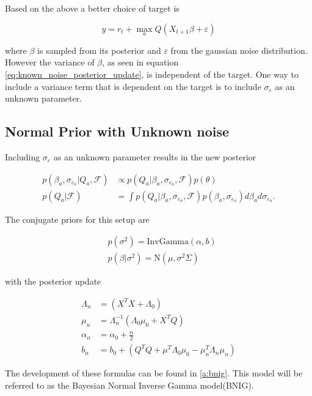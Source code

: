 Based on the above a better choice of target is

$$
y = r_t + \max_aQ(X_{t+1}\beta + \varepsilon)
$$

where $\beta$ is sampled from its posterior and $\varepsilon$ from the gaussian noise distribution. However the variance of $\beta$, as seen in equation \ref{eq:known_noise_posterior_update}, is independent of the target. One way to include a variance term that is dependent on the target is to include $\sigma_{\varepsilon}$ as an unknown parameter.

\subsection{Normal Prior with Unknown noise}

Including $\sigma_{\varepsilon}$ as an unknown parameter results in the new posterior 

\begin{align*}
    p(\beta_a, \sigma_{\varepsilon_a}|Q_a, \mathcal{F}) &\propto p(Q_a| \beta_a, \sigma_{\varepsilon_a}, \mathcal{F})p(\theta) \\
    p(Q_a|\mathcal{F}) &= \int p(Q_a|\beta_a, \sigma_{\varepsilon_a}, \mathcal{F}) p(\beta_a, \sigma_{\varepsilon_a})d\beta_a d\sigma_{\varepsilon_a}.
\end{align*}

The conjugate priors for this setup are

\begin{align*}
    & p(\sigma^2) = \text{InvGamma}(\alpha, b)          \\
    & p(\beta|\sigma^2) = \text{N}(\mu, \sigma^2\Sigma) 
\end{align*}

with the posterior update

\begin{align*}
    \label{eq:unknown_noise_posterior_update}
	\Lambda_n & = (X^TX + \Lambda_0)                                         \\
	\mu_n     & = \Lambda_n^{-1}(\Lambda_0\mu_0 + X^TQ)                      \\
	\alpha_n  & = \alpha_0 + \frac{n}{2}                                     \\
	b_n       & = b_0 + (Q^TQ + \mu^T\Lambda_0\mu_0 - \mu_n^T\Lambda_n\mu_n) 
\end{align*}

The development of these formulas can be found in \ref{a:bnig}. This model will be referred to as the Bayesian Normal Inverse Gamma model(BNIG).

